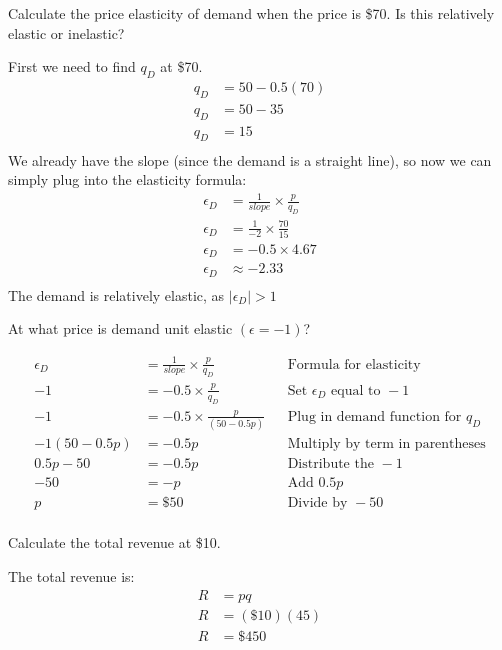 \documentclass[12 pt]{exam}
\begin{document}
\begin{questions}
\question Calculate the price elasticity of demand when the price is \$70. Is this relatively elastic or inelastic?

\begin{solution}
First we need to find $q_D$ at \$70. 
	\begin{align*}
	q_D&=50-0.5(70)\\
	q_D&=50-35\\
	q_D&=15\\
	\end{align*}
	We already have the slope (since the demand is a straight line), so now we can simply plug into the elasticity formula:
		\begin{align*}
	\epsilon_D &=\frac{1}{slope} \times \frac{p}{q_D}	\\
	\epsilon_D &=\frac{1}{-2} \times \frac{70}{15}\\
	\epsilon_D &=-0.5 \times 4.67\\
	\epsilon_D &\approx -2.33\\
	\end{align*}
The demand is relatively elastic, as $|\epsilon_D|>1$

\end{solution}

\question At what price is demand unit elastic $(\epsilon=-1)$?

\begin{solution}

\begin{align*}
		\epsilon_D &=\frac{1}{slope} \times \frac{p}{q_D} & & \text{Formula for elasticity}\\
			-1&=-0.5 \times \frac{p}{q_D} & & \text{Set } \epsilon_D \text{ equal to }-1\\
			-1&=-0.5 \times \frac{p}{(50-0.5p)} & & \text{Plug in demand function for } q_D\\
			-1(50-0.5p)&=-0.5p & & \text{Multiply by term in parentheses}\\
		0.5p-50&=-0.5p & & \text{Distribute the }-1 \\
		-50&=-p & & \text{Add } 0.5p\\
		p&=\$50 & & \text{Divide by }-50\\
		\end{align*}
\end{solution}

\question Calculate the total revenue at \$10.

	\begin{solution}
	The total revenue is:
\begin{align*}
R&=pq\\
R&=(\$10)(45)\\
R&=\$450\\
\end{align*}		
\end{solution}


\end{questions}
\end{document}

